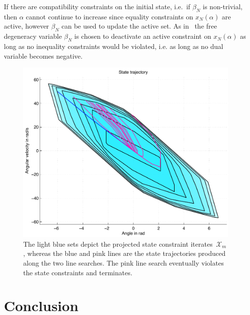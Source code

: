 \documentclass{ifacconf}
\begin{document}
If there are compatibility constraints on the initial state, i.e.\ if $\beta_N$ is non-trivial, then $\alpha$ cannot continue 
to  increase since equality constraints on $x_N(\alpha)$ are active, however $\beta_N$ can be used to update the active set. 
As in~\cite{Buerger:ACC} the free degeneracy variable $\beta_N$ is chosen to deactivate an active constraint on $x_N(\alpha)$ 
as long as no inequality constraints would be violated, i.e. as long as no dual variable becomes negative. 



\begin{figure}
\includegraphics[width=.48\textwidth]{res}
\caption{The light blue sets depict the projected state constraint iterates~$\mathcal X_m$,
    whereas the blue and pink lines are the state trajectories produced along the two line
    searches. The pink line search eventually violates the state constraints and terminates.}
\label{fig:numerical:example}
\end{figure}
\section{Conclusion}\label{sec:conclusion}

\end{document}
